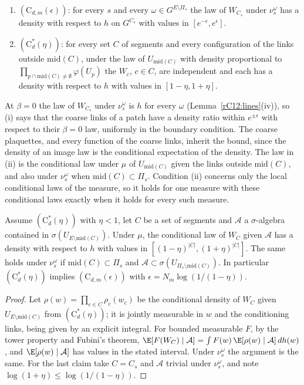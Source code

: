 \begin{definition}\label{rC12:C}
\begin{enumerate}[label=\textup{(\roman*)},leftmargin=*]
\item $(\mathrm C_{d,m}(\epsilon))$: for every $s$ and every $\omega\in
G^{E\setminus\Pi_s}$ the law of $W_{C_s}$ under $\nu^\omega_s$ has a density
with respect to $h$ on $G^{C_s}$ with values in $[e^{-\epsilon},e^\epsilon]$.
\item $(\mathrm C^*_d(\eta))$: for every set $C$ of segments and every
configuration of the links outside $\mathrm{mid}(C)$, under the law of
$U_{\mathrm{mid}(C)}$ with density proportional to $\prod_{p\cap
\mathrm{mid}(C)\ne\emptyset}\varphi(U_p)$ the $W_c$, $c\in C$, are
independent and each has a density with respect to $h$ with values in
$[1-\eta,1+\eta]$.
\end{enumerate}
\end{definition}

At $\beta=0$ the law of $W_{C_s}$ under $\nu^\omega_s$ is $h$ for every
$\omega$ (Lemma~\ref{rC12:lines}(iv)), so (i) says that the coarse links
of a patch have a density ratio within $e^{\pm\epsilon}$ with respect to
their $\beta=0$ law, uniformly in the boundary condition. The coarse
plaquettes, and every function of the coarse links, inherit the bound,
since the density of an image law is the conditional expectation of the
density. The law in (ii) is the conditional law under $\mu$ of
$U_{\mathrm{mid}(C)}$ given the links outside $\mathrm{mid}(C)$, and also
under $\nu^\omega_s$ when $\mathrm{mid}(C)\subset\Pi_s$. Condition (ii)
concerns only the local conditional laws of the measure, so it holds for
one measure with these conditional laws exactly when it holds for every
such measure.

\begin{lemma}\label{rC12:mixture}
Assume $(\mathrm C^*_d(\eta))$ with $\eta<1$, let $C$ be a set of segments
and $\mathcal A$ a $\sigma$-algebra contained in $\sigma(U_{E\setminus
\mathrm{mid}(C)})$. Under $\mu$, the conditional law of $W_C$ given
$\mathcal A$ has a density with respect to $h$ with values in
$[(1-\eta)^{\lvert C\rvert},(1+\eta)^{\lvert C\rvert}]$. The same holds
under $\nu^\omega_s$ if $\mathrm{mid}(C)\subset\Pi_s$ and $\mathcal A\subset
\sigma(U_{\Pi_s\setminus\mathrm{mid}(C)})$. In particular
$(\mathrm C^*_d(\eta))$ implies $(\mathrm C_{d,m}(\epsilon))$ with $\epsilon=
N_m\log(1/(1-\eta))$.
\end{lemma}

\begin{proof}
Let $\rho(w)=\prod_{c\in C}\rho_c(w_c)$ be the conditional density of $W_C$
given $U_{E\setminus\mathrm{mid}(C)}$ from $(\mathrm C^*_d(\eta))$; it is
jointly measurable in $w$ and the conditioning links, being given by an
explicit integral. For bounded measurable $F$, by the tower property and
Fubini's theorem, $\E[F(W_C)\mid\mathcal A]=\int F(w)\,\E[\rho(w)\mid\mathcal
A]\,dh(w)$, and $\E[\rho(w)\mid\mathcal A]$ has values in the stated
interval. Under $\nu^\omega_s$ the argument is the same. For the last claim
take $C=C_s$ and $\mathcal A$ trivial under $\nu^\omega_s$, and note
$\log(1+\eta)\le\log(1/(1-\eta))$.
\end{proof}

